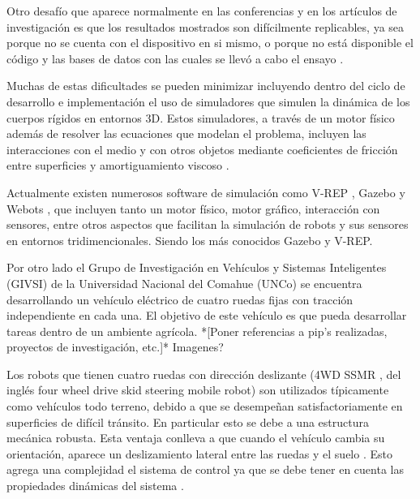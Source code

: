 \documentclass[12pt,a4paper,onecolumn]{article}%
\begin{document}
Otro desafío que aparece normalmente en las conferencias y en los artículos de investigación es que los resultados mostrados son difícilmente replicables, ya sea porque no se cuenta con el dispositivo en si mismo, o porque no está disponible el código y las bases de datos con las cuales se llevó a cabo el ensayo \cite{bon}. 


Muchas de estas dificultades se pueden minimizar incluyendo dentro del ciclo de desarrollo e implementación el uso de simuladores que simulen la dinámica de los cuerpos rígidos en entornos 3D. Estos simuladores, a través de un motor físico  además de resolver las ecuaciones que modelan el problema, incluyen las interacciones con el medio y con otros objetos mediante coeficientes de fricción entre superficies y amortiguamiento viscoso \cite{ode}.

Actualmente existen numerosos software de simulación como  V-REP \cite{vrep}, Gazebo \cite{gazebo}  y Webots \cite{webots}, que incluyen tanto un motor físico, motor gráfico, interacción con sensores, entre otros aspectos que facilitan la simulación de robots y sus sensores en entornos tridimencionales. Siendo los más conocidos  Gazebo y V-REP.  

Por otro lado el Grupo de Investigación en Vehículos y Sistemas Inteligentes (GIVSI) de la Universidad Nacional del Comahue (UNCo) se encuentra desarrollando un vehículo eléctrico de cuatro ruedas fijas con tracción independiente en cada una. El objetivo de este vehículo es que pueda desarrollar tareas dentro de un ambiente agrícola. *[Poner referencias a pip's realizadas, proyectos de investigación, etc.]* Imagenes?

Los robots que tienen cuatro ruedas con dirección deslizante (4WD SSMR , del inglés four wheel drive skid steering mobile robot) %
 son utilizados típicamente como vehículos todo terreno, debido a que se desempeñan satisfactoriamente en superficies de difícil tránsito. En particular esto se debe a una estructura mecánica robusta. Esta ventaja conlleva a que cuando el vehículo cambia su orientación, aparece un deslizamiento lateral entre las ruedas y el suelo . Esto agrega una complejidad el sistema de control ya que se debe tener en cuenta las propiedades dinámicas del sistema \cite{pazderski2004practical}.     
\end{document}
